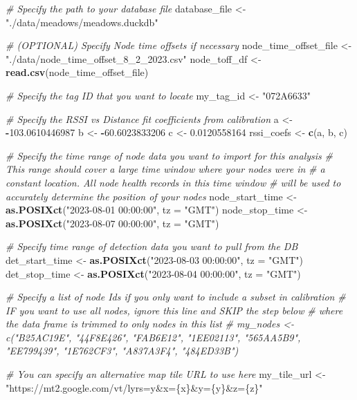 \documentclass[
]{book}
\newenvironment{Shaded}{\begin{snugshade}}{\end{snugshade}}
\newcommand{\AttributeTok}[1]{\textcolor[rgb]{0.13,0.29,0.53}{#1}}
\newcommand{\CommentTok}[1]{\textcolor[rgb]{0.56,0.35,0.01}{\textit{#1}}}
\newcommand{\FloatTok}[1]{\textcolor[rgb]{0.00,0.00,0.81}{#1}}
\newcommand{\FunctionTok}[1]{\textcolor[rgb]{0.13,0.29,0.53}{\textbf{#1}}}
\newcommand{\NormalTok}[1]{#1}
\newcommand{\OtherTok}[1]{\textcolor[rgb]{0.56,0.35,0.01}{#1}}
\newcommand{\SpecialCharTok}[1]{\textcolor[rgb]{0.81,0.36,0.00}{\textbf{#1}}}
\newcommand{\StringTok}[1]{\textcolor[rgb]{0.31,0.60,0.02}{#1}}
\begin{document}
\begin{Shaded}
\begin{Highlighting}[]
\CommentTok{\# Specify the path to your database file}
\NormalTok{database\_file }\OtherTok{\textless{}{-}} \StringTok{"./data/meadows/meadows.duckdb"}

\CommentTok{\# (OPTIONAL) Specify Node time offsets if necessary}
\NormalTok{node\_time\_offset\_file }\OtherTok{\textless{}{-}} \StringTok{"./data/node\_time\_offset\_8\_2\_2023.csv"}
\NormalTok{node\_toff\_df }\OtherTok{\textless{}{-}} \FunctionTok{read.csv}\NormalTok{(node\_time\_offset\_file)}

\CommentTok{\# Specify the tag ID that you want to locate}
\NormalTok{my\_tag\_id }\OtherTok{\textless{}{-}} \StringTok{"072A6633"}

\CommentTok{\# Specify the RSSI vs Distance fit coefficients from calibration}
\NormalTok{a }\OtherTok{\textless{}{-}} \SpecialCharTok{{-}}\FloatTok{103.0610446987}
\NormalTok{b }\OtherTok{\textless{}{-}} \SpecialCharTok{{-}}\FloatTok{60.6023833206}
\NormalTok{c }\OtherTok{\textless{}{-}} \FloatTok{0.0120558164}
\NormalTok{rssi\_coefs }\OtherTok{\textless{}{-}} \FunctionTok{c}\NormalTok{(a, b, c)}

\CommentTok{\# Specify the time range of node data you want to import for this analysis}
\CommentTok{\#   This range should cover a large time window where your nodes were in}
\CommentTok{\#   a constant location.  All node health records in this time window}
\CommentTok{\#   will be used to accurately determine the position of your nodes}
\NormalTok{node\_start\_time }\OtherTok{\textless{}{-}} \FunctionTok{as.POSIXct}\NormalTok{(}\StringTok{"2023{-}08{-}01 00:00:00"}\NormalTok{, }\AttributeTok{tz =} \StringTok{"GMT"}\NormalTok{)}
\NormalTok{node\_stop\_time }\OtherTok{\textless{}{-}} \FunctionTok{as.POSIXct}\NormalTok{(}\StringTok{"2023{-}08{-}07 00:00:00"}\NormalTok{, }\AttributeTok{tz =} \StringTok{"GMT"}\NormalTok{)}

\CommentTok{\# Specify time range of detection data you want to pull from the DB}
\NormalTok{det\_start\_time }\OtherTok{\textless{}{-}} \FunctionTok{as.POSIXct}\NormalTok{(}\StringTok{"2023{-}08{-}03 00:00:00"}\NormalTok{, }\AttributeTok{tz =} \StringTok{"GMT"}\NormalTok{)}
\NormalTok{det\_stop\_time }\OtherTok{\textless{}{-}} \FunctionTok{as.POSIXct}\NormalTok{(}\StringTok{"2023{-}08{-}04 00:00:00"}\NormalTok{, }\AttributeTok{tz =} \StringTok{"GMT"}\NormalTok{)}

\CommentTok{\# Specify a list of node Ids if you only want to include a subset in calibration}
\CommentTok{\# IF you want to use all nodes, ignore this line and SKIP the step below}
\CommentTok{\# where the data frame is trimmed to only nodes in this list}
\CommentTok{\# my\_nodes \textless{}{-} c("B25AC19E", "44F8E426", "FAB6E12", "1EE02113", "565AA5B9", "EE799439", "1E762CF3", "A837A3F4", "484ED33B")}

\CommentTok{\# You can specify an alternative map tile URL to use here}
\NormalTok{my\_tile\_url }\OtherTok{\textless{}{-}} \StringTok{"https://mt2.google.com/vt/lyrs=y\&x=\{x\}\&y=\{y\}\&z=\{z\}"}
\end{Highlighting}
\end{Shaded}
\end{document}
